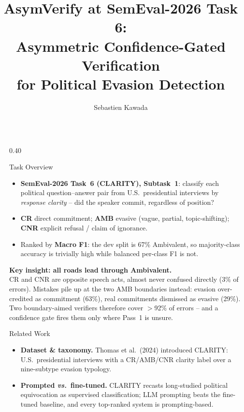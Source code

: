 \documentclass[final]{beamer}
\title{AsymVerify at SemEval-2026 Task 6:\\Asymmetric Confidence-Gated Verification\\for Political Evasion Detection}
\author{Sebastien Kawada}
\institute{Kaons, Los Angeles, CA, USA \enspace\textbar\enspace CLARITY, Subtask 1 (Clarity-level Classification) \enspace\textbar\enspace sebastien@kaons.com}
\newlength{\sepwidth}\setlength{\sepwidth}{0.025\paperwidth}
\newcommand{\separatorcolumn}{\begin{column}{\sepwidth}\end{column}}
\newcommand{\clCR}{\textbf{\color{passThree}CR}}
\newcommand{\clAMB}{\textbf{\color{purpleBrand}AMB}}
\newcommand{\clCNR}{\textbf{\color{passTwo}CNR}}
\begin{document}
\begin{frame}[t]

\begin{columns}[t]
\separatorcolumn
\begin{column}{0.40\paperwidth}
  \begin{block}{Task Overview}
    \begin{itemize}
      \item \textbf{SemEval-2026 Task~6 (CLARITY), Subtask~1}: classify each political
        question--answer pair from U.S.\ presidential interviews by \emph{response clarity} --
        did the speaker commit, regardless of position?
      \item \clCR{} direct commitment; \clAMB{} evasive (vague, partial, topic-shifting);
        \clCNR{} explicit refusal / claim of ignorance.
      \item Ranked by \textbf{Macro F1}: the dev split is 67\% Ambivalent, so majority-class
        accuracy is trivially high while balanced per-class F1 is not.
    \end{itemize}
  \end{block}
  \begin{tbox}[colback=lavender!60, colframe=purpleBrand, boxrule=1.6pt,
               left=4mm, right=4mm, top=2.5mm, bottom=2.5mm]
    {\large\bfseries\color{purpleDeep}Key insight: all roads lead through Ambivalent.}\\[1.5mm]
    CR and CNR are opposite speech acts, almost never confused directly (3\% of errors).
    Mistakes pile up at the two AMB boundaries instead: evasion over-credited as commitment
    (63\%), real commitments dismissed as evasive (29\%). Two boundary-aimed verifiers
    therefore cover $>$92\% of errors -- and a confidence gate fires them only where
    Pass~1 is unsure.
  \end{tbox}
  \begin{block}{Related Work}
    \begin{itemize}
      \item \textbf{Dataset \& taxonomy.} Thomas et al.\ (2024) introduced CLARITY:
        U.S.\ presidential interviews with a CR/AMB/CNR clarity label over a nine-subtype
        evasion typology.
      \item \textbf{Prompted \emph{vs.}\ fine-tuned.} CLARITY recasts long-studied political
        equivocation as supervised classification; LLM prompting beats the fine-tuned
        baseline, and every top-ranked system is prompting-based.

\end{itemize}
\end{block}
\end{column}
\end{columns}
\end{frame}
\end{document}
